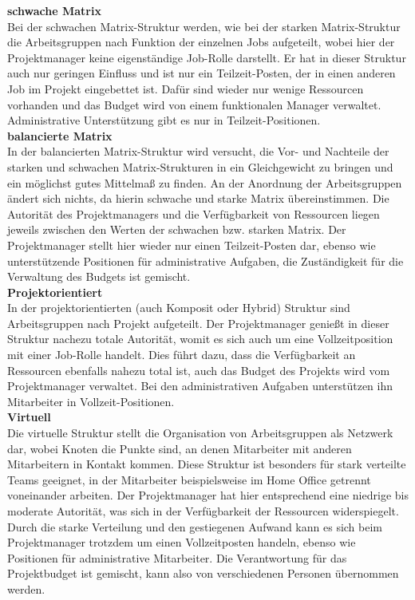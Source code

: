 \documentclass[ThesisDJ.tex]{subfiles}
\begin{document}
\textbf{schwache Matrix}\\
Bei der schwachen Matrix-Struktur werden, wie bei der starken Matrix-Struktur die Arbeitsgruppen nach Funktion der einzelnen Jobs aufgeteilt, wobei hier der Projektmanager keine eigenständige Job-Rolle darstellt. Er hat in dieser Struktur auch nur geringen Einfluss und ist nur ein Teilzeit-Posten, der in einen anderen Job im Projekt eingebettet ist. Dafür sind wieder nur wenige Ressourcen vorhanden und das Budget wird von einem funktionalen Manager verwaltet. Administrative Unterstützung gibt es nur in Teilzeit-Positionen.\medskip\\

\textbf{balancierte Matrix}\\
In der balancierten Matrix-Struktur wird versucht, die Vor- und Nachteile der starken und schwachen Matrix-Strukturen in ein Gleichgewicht zu bringen und ein möglichst gutes Mittelmaß zu finden. An der Anordnung der Arbeitsgruppen ändert sich nichts, da hierin schwache und starke Matrix übereinstimmen. Die Autorität des Projektmanagers und die Verfügbarkeit von Ressourcen liegen jeweils zwischen den Werten der schwachen bzw. starken Matrix. Der Projektmanager stellt hier wieder nur einen Teilzeit-Posten dar, ebenso wie unterstützende Positionen für administrative Aufgaben, die Zuständigkeit für die Verwaltung des Budgets ist gemischt.\medskip\\

\textbf{Projektorientiert}\\
In der projektorientierten (auch Komposit oder Hybrid) Struktur sind Arbeitsgruppen nach Projekt aufgeteilt. Der Projektmanager genießt in dieser Struktur nachezu totale Autorität, womit es sich auch um eine Vollzeitposition mit einer Job-Rolle handelt. Dies führt dazu, dass die Verfügbarkeit an Ressourcen ebenfalls nahezu total ist, auch das Budget des Projekts wird vom Projektmanager verwaltet. Bei den administrativen Aufgaben unterstützen ihn Mitarbeiter in Vollzeit-Positionen.\medskip\\

\textbf{Virtuell}\\
Die virtuelle Struktur stellt die Organisation von Arbeitsgruppen als Netzwerk dar, wobei Knoten die Punkte sind, an denen Mitarbeiter mit anderen Mitarbeitern in Kontakt kommen. Diese Struktur ist besonders für stark verteilte Teams geeignet, in der Mitarbeiter beispielsweise im Home Office getrennt voneinander arbeiten. Der Projektmanager hat hier entsprechend eine niedrige bis moderate Autorität, was sich in der Verfügbarkeit der Ressourcen widerspiegelt. Durch die starke Verteilung und den gestiegenen Aufwand kann es sich beim Projektmanager trotzdem um einen Vollzeitposten handeln, ebenso wie Positionen für administrative Mitarbeiter. Die Verantwortung für das Projektbudget ist gemischt, kann also von verschiedenen Personen übernommen werden.\medskip\\
\end{document}
